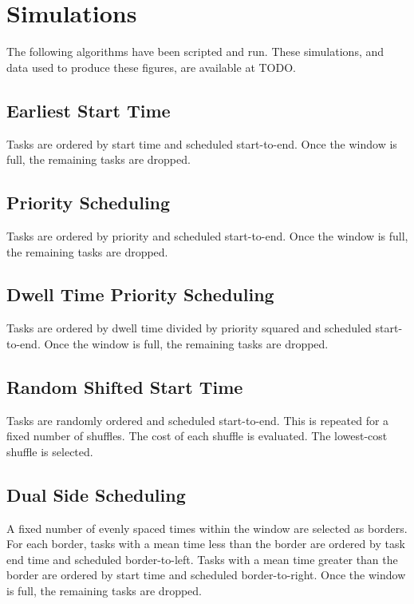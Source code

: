 \documentclass[conference]{IEEEtran}
\begin{document}
\section{Simulations}

The following algorithms have been scripted and run.
These simulations, and data used to produce these figures, are available at TODO.
\subsection{Earliest Start Time}

Tasks are ordered by start time and scheduled start-to-end.
Once the window is full, the remaining tasks are dropped.

\subsection{Priority Scheduling}

Tasks are ordered by priority and scheduled start-to-end.
Once the window is full, the remaining tasks are dropped.

\subsection{Dwell Time Priority Scheduling}

Tasks are ordered by dwell time divided by priority squared and scheduled start-to-end.
Once the window is full, the remaining tasks are dropped.

\subsection{Random Shifted Start Time}

Tasks are randomly ordered and scheduled start-to-end.
This is repeated for a fixed number of shuffles.
The cost of each shuffle is evaluated.
The lowest-cost shuffle is selected.

\subsection{Dual Side Scheduling}

A fixed number of evenly spaced times within the window are selected as borders.
For each border, tasks with a mean time less than the border are ordered by task end time and scheduled border-to-left.
Tasks with a mean time greater than the border are ordered by start time and scheduled border-to-right.
Once the window is full, the remaining tasks are dropped.
\end{document}
